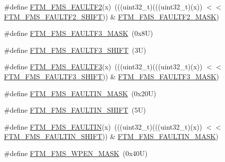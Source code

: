 \begin{DoxyCompactItemize}
\item 
\#define \mbox{\hyperlink{group___f_t_m___register___masks_ga7b94c3078227d809c25b6125cea45d4f}{F\+T\+M\+\_\+\+F\+M\+S\+\_\+\+F\+A\+U\+L\+T\+F2}}(x)~(((uint32\+\_\+t)(((uint32\+\_\+t)(x)) $<$$<$ \mbox{\hyperlink{group___f_t_m___register___masks_gacb61aa3f7e4a264827c43842a9613c7f}{F\+T\+M\+\_\+\+F\+M\+S\+\_\+\+F\+A\+U\+L\+T\+F2\+\_\+\+S\+H\+I\+FT}})) \& \mbox{\hyperlink{group___f_t_m___register___masks_ga76fb2949ba41a73e6e8c1a3d65a37acf}{F\+T\+M\+\_\+\+F\+M\+S\+\_\+\+F\+A\+U\+L\+T\+F2\+\_\+\+M\+A\+SK}})
\item 
\#define \mbox{\hyperlink{group___f_t_m___register___masks_ga597e9b2d96d1816bb7353b2f5cb3d2b1}{F\+T\+M\+\_\+\+F\+M\+S\+\_\+\+F\+A\+U\+L\+T\+F3\+\_\+\+M\+A\+SK}}~(0x8\+U)
\item 
\#define \mbox{\hyperlink{group___f_t_m___register___masks_ga382e6be42b0f3b858d7b84eca9874ec0}{F\+T\+M\+\_\+\+F\+M\+S\+\_\+\+F\+A\+U\+L\+T\+F3\+\_\+\+S\+H\+I\+FT}}~(3\+U)
\item 
\#define \mbox{\hyperlink{group___f_t_m___register___masks_gaba6be31b229fb3aa5aa32f9ff9b14b15}{F\+T\+M\+\_\+\+F\+M\+S\+\_\+\+F\+A\+U\+L\+T\+F3}}(x)~(((uint32\+\_\+t)(((uint32\+\_\+t)(x)) $<$$<$ \mbox{\hyperlink{group___f_t_m___register___masks_ga382e6be42b0f3b858d7b84eca9874ec0}{F\+T\+M\+\_\+\+F\+M\+S\+\_\+\+F\+A\+U\+L\+T\+F3\+\_\+\+S\+H\+I\+FT}})) \& \mbox{\hyperlink{group___f_t_m___register___masks_ga597e9b2d96d1816bb7353b2f5cb3d2b1}{F\+T\+M\+\_\+\+F\+M\+S\+\_\+\+F\+A\+U\+L\+T\+F3\+\_\+\+M\+A\+SK}})
\item 
\#define \mbox{\hyperlink{group___f_t_m___register___masks_ga8dc6b10cac09f19a505e0e1f6348e2ff}{F\+T\+M\+\_\+\+F\+M\+S\+\_\+\+F\+A\+U\+L\+T\+I\+N\+\_\+\+M\+A\+SK}}~(0x20\+U)
\item 
\#define \mbox{\hyperlink{group___f_t_m___register___masks_ga7a46a22f36d059f68a8ac08aca8df377}{F\+T\+M\+\_\+\+F\+M\+S\+\_\+\+F\+A\+U\+L\+T\+I\+N\+\_\+\+S\+H\+I\+FT}}~(5\+U)
\item 
\#define \mbox{\hyperlink{group___f_t_m___register___masks_ga165e5b25d1ee4a7a90b113bab883cb28}{F\+T\+M\+\_\+\+F\+M\+S\+\_\+\+F\+A\+U\+L\+T\+IN}}(x)~(((uint32\+\_\+t)(((uint32\+\_\+t)(x)) $<$$<$ \mbox{\hyperlink{group___f_t_m___register___masks_ga7a46a22f36d059f68a8ac08aca8df377}{F\+T\+M\+\_\+\+F\+M\+S\+\_\+\+F\+A\+U\+L\+T\+I\+N\+\_\+\+S\+H\+I\+FT}})) \& \mbox{\hyperlink{group___f_t_m___register___masks_ga8dc6b10cac09f19a505e0e1f6348e2ff}{F\+T\+M\+\_\+\+F\+M\+S\+\_\+\+F\+A\+U\+L\+T\+I\+N\+\_\+\+M\+A\+SK}})
\item 
\#define \mbox{\hyperlink{group___f_t_m___register___masks_gada77d4d54efd09f61e02636d5e234f94}{F\+T\+M\+\_\+\+F\+M\+S\+\_\+\+W\+P\+E\+N\+\_\+\+M\+A\+SK}}~(0x40\+U)
$$
\end{DoxyCompactItemize}

